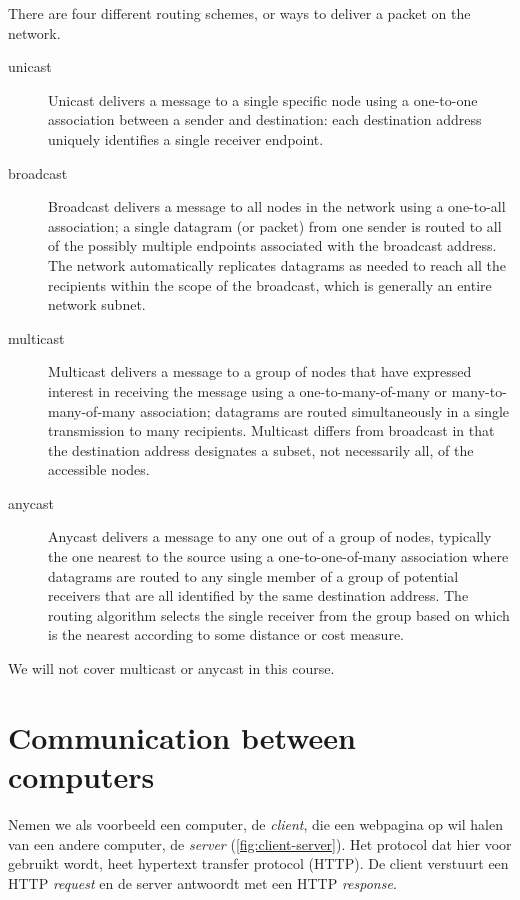 There are four different routing schemes, or ways to deliver a packet on the network.
\begin{description}
\item[unicast] Unicast delivers a message to a single specific node using a one-to-one association between a sender and destination: each destination address uniquely identifies a single receiver endpoint.
\item[broadcast] Broadcast delivers a message to all nodes in the network using a one-to-all association; a single datagram (or packet) from one sender is routed to all of the possibly multiple endpoints associated with the broadcast address. The network automatically replicates datagrams as needed to reach all the recipients within the scope of the broadcast, which is generally an entire network subnet.
\item[multicast] Multicast delivers a message to a group of nodes that have expressed interest in receiving the message using a one-to-many-of-many or many-to-many-of-many association; datagrams are routed simultaneously in a single transmission to many recipients. Multicast differs from broadcast in that the destination address designates a subset, not necessarily all, of the accessible nodes.
\item[anycast] Anycast delivers a message to any one out of a group of nodes, typically the one nearest to the source using a one-to-one-of-many as\-so\-ci\-a\-tion where datagrams are routed to any single member of a group of potential receivers that are all identified by the same destination address. The routing algorithm selects the single receiver from the group based on which is the nearest according to some distance or cost measure.
\end{description}
We will not cover multicast or anycast in this course.



\section{Communication between computers}



Nemen we als voorbeeld een computer, de \emph{client}, die een webpagina op wil halen van een andere computer, de \emph{server} (\vref{fig:client-server}).
Het protocol dat hier voor gebruikt wordt, heet hypertext transfer protocol (HTTP).
De client verstuurt een HTTP \emph{request} en de server antwoordt met een HTTP \emph{response}.

